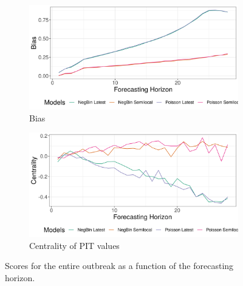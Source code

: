 \begin{figure}[H]
\begin{subfigure}{0.5\textwidth}
  \centering
  \includegraphics[width=\linewidth]{../output/Nyiragongo_bias.png}  
  \caption{Bias}
  \label{fig:sub-third}
\end{subfigure}
\begin{subfigure}{0.5\textwidth}
  \centering
  \includegraphics[width=\linewidth]{../output/Nyiragongo_centrality.png}  
  \caption{Centrality of PIT values}
  \label{fig:nat_scores_4}
\end{subfigure}
  \caption{Scores for the entire outbreak as a function of the forecasting horizon.}

  \label{fig:nat_scores}
\end{figure}

